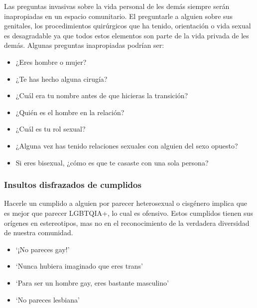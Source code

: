 \documentclass[12pt,openany]{book}
\begin{document}
Las preguntas invasivas sobre la vida personal de les demás siempre serán inapropiadas en un espacio comunitario. El preguntarle a alguien sobre sus genitales, los procedimientos quirúrgicos que ha tenido, orientación o vida sexual es desagradable ya que todos estos elementos son parte de la vida privada de les demás. Algunas preguntas inapropiadas podrían ser:

\begin{itemize}
  \setlength\itemsep{-0.3em}
  \item ¿Eres hombre o mujer?
  \item ¿Te has hecho alguna cirugía?
  \item ¿Cuál era tu nombre antes de que hicieras la transición?
  \item ¿Quién es el hombre en la relación?
  \item ¿Cuál es tu rol sexual?
  \item ¿Alguna vez has tenido relaciones sexuales con alguien del sexo opuesto?
  \item Si eres bisexual, ¿cómo es que te casaste con una sola persona?
\end{itemize}

\subsubsection*{Insultos disfrazados de cumplidos}

Hacerle un cumplido a alguien por parecer heterosexual o cisgénero implica que es mejor que parecer LGBTQIA+, lo cual es ofensivo. Estos cumplidos tienen sus orígenes en estereotipos, mas no en el reconocimiento de la verdadera diversidad de nuestra comunidad.

\begin{figure}[h]
    \centering
\end{figure}
\begin{itemize}
  \setlength\itemsep{-0.3em}
  \item `¡No pareces gay!'
  \item `Nunca hubiera imaginado que eres trans'
  \item `Para ser un hombre gay, eres bastante masculino'
  \item `No pareces lesbiana'
\end{itemize}
\end{document}
